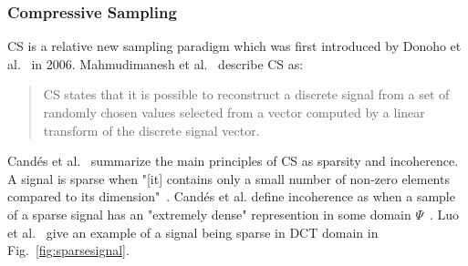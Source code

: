 \subsubsection{Compressive Sampling}
\label{sec:Compressive Sampling}

\ac{CS} is a relative new sampling paradigm which was first
introduced by Donoho et al.~\cite{Donoho06compressedsensing} in 2006. 
Mahmudimanesh et al.~\cite{mahmudimanesh2010reordering} describe \ac{CS} as:

\begin{quotation}
    \ac{CS} states that it is possible to reconstruct a discrete signal from a set of
    randomly chosen values selected from a vector computed by a linear transform
    of the discrete signal vector.
\end{quotation}

Candés et al.~\cite{candes2008introduction} summarize the main principles of
\ac{CS} as sparsity and incoherence. A signal is sparse when "[it] contains
only a small number of non-zero elements compared to its
dimension"~\cite{elzanati2015collaborative}. Candés et al. define incoherence
as when a sample of a sparse signal has an "extremely dense" represention in
some domain $ \Psi $~\cite{candes2008introduction}. Luo et
al.~\cite{luo2009compressive} give an example of a signal being sparse in
\ac{DCT} domain in Fig.~\ref{fig:sparsesignal}.

